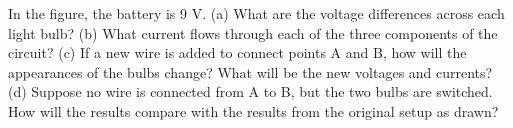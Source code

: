 In the figure, the battery is 9 V.  \hwendpart
        (a) What are the
        voltage differences across each light bulb?\answercheck  \hwendpart
        (b) What
        current flows through each of the three components of the
        circuit?  \answercheck\hwendpart
        (c) If a new wire is added to connect points A and
        B, how will the appearances of the bulbs change?  What
        will be the new voltages and currents?  \hwendpart
        (d) Suppose no wire
        is connected from A to B, but the two bulbs are switched. 
        How will the results compare with the results from the
        original setup as drawn?
